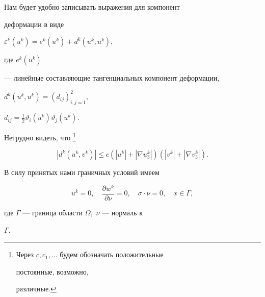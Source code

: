 Нам будет удобно записывать выражения для компонент


деформации в виде 


$\varepsilon ^{k}(u^{k}) = e^{k}(u^{k}) + 


d^{k}(u^{k},u^{k}), $ 


где $e^{k}(u^{k})$


--- линейные составляющие тангенциальных компонент деформации, \linebreak[4]




$ d^k(u^k, u^k) = \left ( d_{ij} \right ) _{i,j = 1}^2,$


$d_{ij} = \frac{1}{2}


\vartheta_i \left ( u^k \right )


\vartheta_j \left ( u^k \right ) . $




Нетрудно видеть, что \footnote[1]{


Через $c, c_1, \dotsc$ будем обозначать положительные


постоянные, возможно, 


различные.}


\begin{equation}


\label{duv}


|d^{k}(u^{k},v^{k})| \le 


c(| u^{k}| +| \nabla u^{k}_{3}| )


(| v^{k}| +| \nabla v^{k}_{3}| ).


\end{equation}





В силу принятых нами граничных условий имеем


\begin{equation}


\label{bound}


u^{k}=0,\quad \frac{\partial w^{k}} { \partial \nu}= 0, \quad 


\sigma \cdot \nu =0,\quad x \in \Gamma ,


\end{equation}


где $\Gamma $ --- граница области $ \Omega,$ $ \nu $ --- нормаль к 


$\Gamma $.





